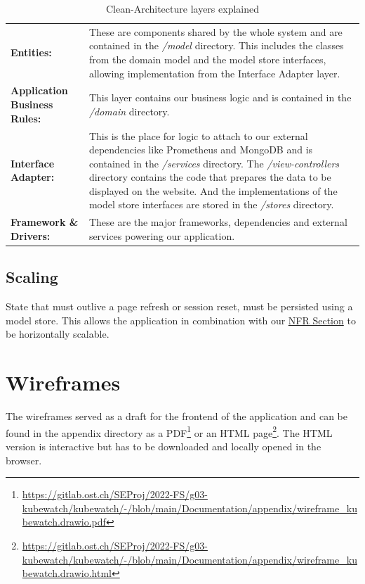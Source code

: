\begin{table}[H]
  \begin{tabular*}{\textwidth}{p{3cm} | p{11cm}}
    \textbf{Entities:} &
      These are components shared by the whole system and are contained
      in the \textit{/model} directory.
      This includes the classes from the domain model and the model store interfaces,
      allowing implementation from the Interface Adapter layer. \bigskip \\
    \textbf{Application Business Rules:} &
      This layer contains our business logic and is contained in
      the \textit{/domain} directory. \bigskip \\
    \textbf{Interface Adapter:} &
      This is the place for logic to attach to our external dependencies
      like Prometheus and MongoDB and is contained in the \textit{/services} directory.
      The \textit{/view-controllers} directory contains the code
      that prepares the data to be displayed on the website.
      And the implementations of the model store interfaces are stored
      in the \textit{/stores} directory. \bigskip \\
    \textbf{Framework \& Drivers:} &
      These are the major frameworks, dependencies and external services powering our application. \\
  \end{tabular*}
  \caption{Clean-Architecture layers explained}
  \label{tab:clean-architecture-layers-explained}
\end{table}

\subsection{Scaling}
State that must outlive a page refresh or session reset, must be persisted using a model store.
This allows the application in combination with our \hyperref[section:non-functional-requirements]{NFR Section} to be horizontally scalable.

\section{Wireframes}
The wireframes served as a draft for the frontend of the application and can be found in the appendix directory as a
PDF\footnote{\url{https://gitlab.ost.ch/SEProj/2022-FS/g03-kubewatch/kubewatch/-/blob/main/Documentation/appendix/wireframe_kubewatch.drawio.pdf}}
or an HTML page\footnote{\url{https://gitlab.ost.ch/SEProj/2022-FS/g03-kubewatch/kubewatch/-/blob/main/Documentation/appendix/wireframe_kubewatch.drawio.html}}.
The HTML version is interactive but has to be downloaded and locally opened in the browser.

